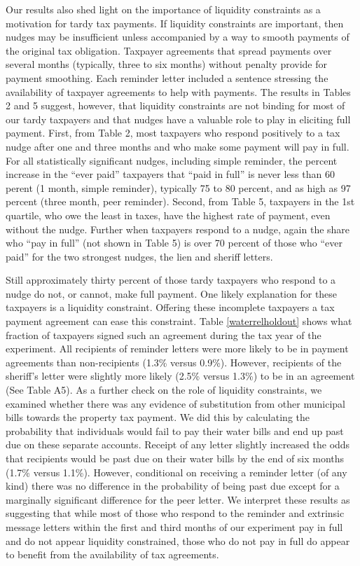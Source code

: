 \documentclass[12pt]{article}
\begin{document}
Our results also shed light on the importance of liquidity constraints as a motivation for tardy tax payments. If liquidity constraints are important, then nudges may be insufficient unless accompanied by a way to smooth payments of the original tax obligation. Taxpayer agreements that spread payments over several months (typically, three to six months) without penalty provide for payment smoothing. Each reminder letter included a sentence stressing the availability of taxpayer agreements to help with payments. The results in Tables 2 and 5 suggest, however, that liquidity constraints are not binding for most of our tardy taxpayers and that nudges have a valuable role to play in eliciting full payment. First, from Table 2, most taxpayers who respond positively to a tax nudge after one and three months and who make some payment will pay in full. For all statistically significant nudges, including simple reminder, the percent increase in the ``ever paid'' taxpayers that ``paid in full'' is never less than 60 perent (1 month, simple reminder), typically 75 to 80 percent, and as high as 97 percent (three month, peer reminder). Second, from Table 5, taxpayers in the 1st quartile, who owe the least in taxes, have the highest rate of payment, even without the nudge. Further  when taxpayers respond to a nudge, again the share who ``pay in full'' (not shown in Table 5) is over 70 percent of those who ``ever paid'' for the two strongest nudges, the lien and sheriff letters.

Still approximately thirty percent of those tardy taxpayers who respond to a nudge do not, or cannot, make full payment. One likely explanation for these taxpayers is a liquidity constraint. Offering these incomplete taxpayers a tax payment agreement can ease this constraint. Table \ref{waterrelholdout} shows what fraction of taxpayers signed such an agreement during the tax year of the experiment. All recipients of reminder letters were more likely to
be in payment agreements than non-recipients (1.3\% versus 0.9\%). However, recipients
of the sheriff's letter were slightly more likely (2.5\% versus 1.3\%)
to be in an agreement (See Table A5). As a further check on the role of liquidity constraints, we
examined whether there was any evidence of substitution from other
municipal bills towards the property tax payment. We did this by
calculating the probability that individuals would fail to pay their
water bills and end up past due on these separate accounts. Receipt
of any letter slightly increased the odds that recipients would be
past due on their water bills by the end of six months (1.7\% versus
1.1\%). However, conditional on receiving a reminder letter (of any
kind) there was no difference in the probability of being past
due except for a marginally significant difference for the peer letter.
We interpret these results as suggesting that while most of those who respond to the reminder and extrinsic message letters within the first and third months of our experiment pay in full and do not appear liquidity constrained, those who do not pay in full do appear to benefit from the availability of tax agreements.
\end{document}

